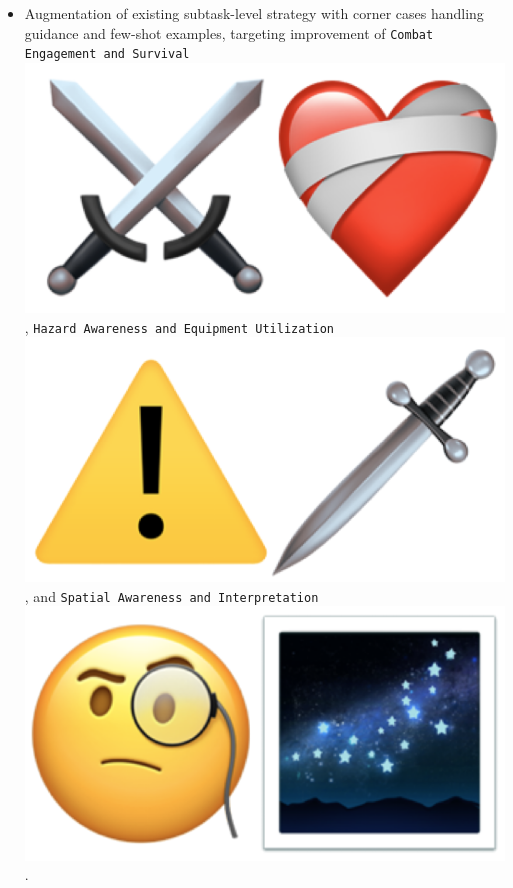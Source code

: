 \begin{flushleft}
\begin{itemize}
    \item Augmentation of existing subtask-level strategy with corner cases handling guidance and few-shot examples, targeting improvement of \texttt{Combat Engagement and Survival} \includegraphics[scale=0.07]{figs/emojis/mini_5.png}, \texttt{Hazard Awareness and Equipment Utilization} \includegraphics[scale=0.07]{figs/emojis/mini_3.png}, and \texttt{Spatial Awareness and Interpretation} \includegraphics[scale=0.07]{figs/emojis/mini_7.png}.

\end{itemize}
\end{flushleft}
